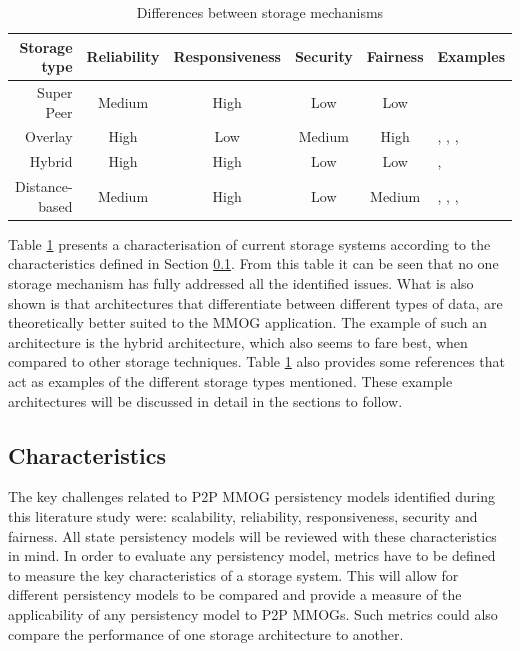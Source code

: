 \documentclass[10pt,a4paper,journal,cspaper,compsoc]{IEEEtran}
\begin{document}
\begin{table}[htbp]
\centering
\begin{tabular}{|r|c|c|c|c|l|}
\hline
Storage type & Reliability & Responsiveness & Security & Fairness & Examples\\
\hline
Super Peer & Medium & High & Low & Low & \cite{knutsson_p2p_first}\\
Overlay & High & Low & Medium & High & \cite{Douglas05enablingmassively}, \cite{using_freenet_storage},
\cite{Fan_phd}, \cite{past_storage_focus}\\
Hybrid & High & High & Low & Low & \cite{zoned_federation}, \cite{hybrid_storage1}\\
Distance-based & Medium & High & Low & Medium & \cite{Buyukkaya_voronoi_state_management}, \cite{Hu_voronoi_IM},
\cite{colyseus_distance_based}, \cite{solipsis}\\
\hline
\end{tabular}
\caption{Differences between storage mechanisms} \label{tab_storage}
\end{table}
%
Table \ref{tab_storage} presents a characterisation of current storage systems according to the characteristics defined in Section
\ref{key_challenges_cm}. From this table it can be seen that no one storage mechanism has fully addressed all the identified issues. What is also
shown is that architectures that differentiate between different types of data, are theoretically better suited to the MMOG application. The example
of such an architecture is the hybrid architecture, which also seems to fare best, when compared to other storage techniques. Table \ref{tab_storage}
also provides some references that act as examples of the different storage types mentioned. These example architectures will be discussed in detail
in the sections to follow.

\subsection{Characteristics}
\label{key_challenges_cm}

The key challenges related to P2P MMOG persistency models identified during this literature study were: scalability, reliability, responsiveness,
security and fairness. All state persistency models will be reviewed with these characteristics in mind. In order to evaluate any persistency model,
metrics have to be defined to measure the key characteristics of a storage system. This will allow for different persistency models to be compared
and provide a measure of the applicability of any persistency model to P2P MMOGs. Such metrics could also compare the performance of one storage
architecture to another.
\end{document}
